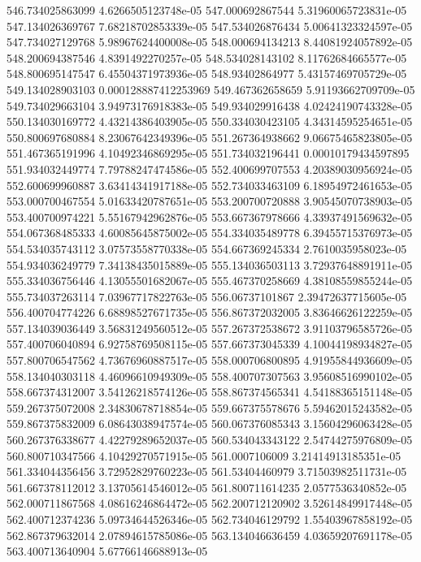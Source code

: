 {546.734025863099 4.6266505123748e-05
547.000692867544 5.31960065723831e-05
547.134026369767 7.68218702853339e-05
547.534026876434 5.00641323324597e-05
547.734027129768 5.98967624400008e-05
548.000694134213 8.44081924057892e-05
548.200694387546 4.8391492270257e-05
548.534028143102 8.11762684665577e-05
548.800695147547 6.45504371973936e-05
548.93402864977 5.43157469705729e-05
549.134028903103 0.000128887412253969
549.467362658659 5.91193662709709e-05
549.734029663104 3.94973176918383e-05
549.934029916438 4.02424190743328e-05
550.134030169772 4.43214386403905e-05
550.334030423105 4.34314595254651e-05
550.800697680884 8.23067642349396e-05
551.267364938662 9.06675465823805e-05
551.467365191996 4.10492346869295e-05
551.734032196441 0.00010179434597895
551.934032449774 7.79788247474586e-05
552.400699707553 4.20389030956924e-05
552.600699960887 3.63414341917188e-05
552.734033463109 6.18954972461653e-05
553.000700467554 5.01633420787651e-05
553.200700720888 3.90545070738903e-05
553.400700974221 5.55167942962876e-05
553.667367978666 4.33937491569632e-05
554.067368485333 4.60085645875002e-05
554.334035489778 6.39455715376973e-05
554.534035743112 3.07573558770338e-05
554.667369245334 2.7610035958023e-05
554.934036249779 7.34138435015889e-05
555.134036503113 3.72937648891911e-05
555.334036756446 4.13055501682067e-05
555.467370258669 4.38108559855244e-05
555.734037263114 7.03967717822763e-05
556.06737101867 2.39472637715605e-05
556.400704774226 6.68898527671735e-05
556.867372032005 3.83646626122259e-05
557.134039036449 3.56831249560512e-05
557.267372538672 3.91103796585726e-05
557.400706040894 6.92758769508115e-05
557.667373045339 4.10044198934827e-05
557.800706547562 4.73676960887517e-05
558.000706800895 4.91955844936609e-05
558.134040303118 4.46096610949309e-05
558.400707307563 3.95608516990102e-05
558.667374312007 3.54126218574126e-05
558.867374565341 4.54188365151148e-05
559.267375072008 2.34830678718854e-05
559.667375578676 5.59462015243582e-05
559.867375832009 6.08643038947574e-05
560.067376085343 3.15604296063428e-05
560.267376338677 4.42279289652037e-05
560.534043343122 2.54744275976809e-05
560.800710347566 4.10429270571915e-05
561.0007106009 3.21414913185351e-05
561.334044356456 3.72952829760223e-05
561.53404460979 3.71503982511731e-05
561.667378112012 3.13705614546012e-05
561.800711614235 2.0577536340852e-05
562.000711867568 4.08616246864472e-05
562.200712120902 3.52614849917448e-05
562.400712374236 5.09734644526346e-05
562.734046129792 1.55403967858192e-05
562.867379632014 2.07894615785086e-05
563.134046636459 4.03659207691178e-05
563.400713640904 5.67766146688913e-05
}
